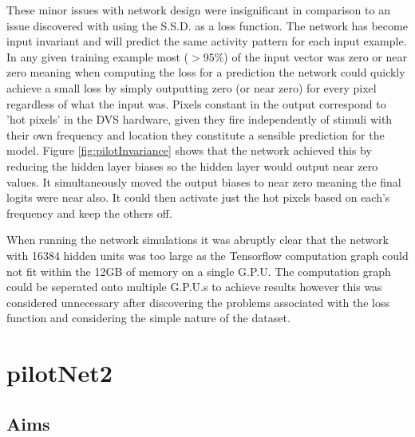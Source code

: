 These minor issues with network design were insignificant in comparison to an issue discovered with using the S.S.D. as a loss function. 
The network has become input invariant and will predict the same activity pattern for each input example. 
In any given training example most ($>95\%$) of the input vector was zero or near zero meaning when computing the loss for a prediction the network could quickly achieve a small loss by simply outputting zero (or near zero) for every pixel regardless of what the input was. 
Pixels constant in the output correspond to 'hot pixels' in the DVS hardware, given they fire independently of stimuli with their own frequency and location they constitute a sensible prediction for the model. 
Figure \ref{fig:pilotInvariance} shows that the network achieved this by reducing the hidden layer biases so the hidden layer would output near zero values. 
It simultaneously moved the output biases to near zero meaning the final logits were near also. 
It could then activate just the hot pixels based on each's frequency and keep the others off. 


When running the network simulations it was abruptly clear that the network with 16384 hidden units was too large as the Tensorflow computation graph could not fit within the 12GB of memory on a single G.P.U.
The computation graph could be seperated onto multiple G.P.U.s to achieve results however this was considered unnecessary after discovering the problems associated with the loss function and considering the simple nature of the dataset.




\section{pilotNet2}

\subsection{Aims}

